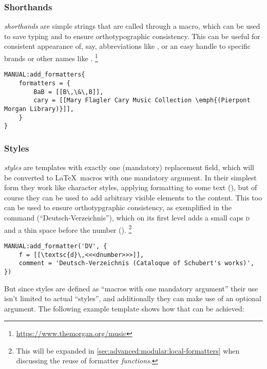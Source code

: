 \documentclass[12pt]{scrartcl}
\begin{document}
\subsubsection{Shorthands}
\label{sec:shorthands}

\emph{shorthands} are simple strings that are called through a macro, which can
be used to save typing and to ensure orthotypographic consistency.  This can be
useful for consistent appearance of, say, abbreviations like
, or an easy handle to specific brands or
other names like .%
\footnote{\url{https://www.themorgan.org/music}} %

\begin{verbatim}
MANUAL:add_formatters{
    formatters = {
        BaB = [[B\,\&\,B]],
        cary = [[Mary Flagler Cary Music Collection \emph{(Pierpont Morgan Library)}]],
    }
}
\end{verbatim}


\subsubsection{Styles}
\label{sec:defining:styles}

\emph{styles} are templates with exactly one (mandatory) replacement field,
which will be converted to \LaTeX\ macros with one mandatory argument.  In their
simplest form they work like character styles, applying formatting to some text
(), but of course they can be used
to add arbitrary visible elements to the content.  This too can be used to
ensure orthotypgraphic consistency, as exemplified in the command 
(“Deutsch-Verzeichnis”), which on its first level adds a small caps \textsc{d}
and a thin space before the number
().%
\footnote{This will be expanded in \vref{sec:advanced:modular:local-formatters}
when discussing the reuse of formatter \emph{functions}.}

\begin{verbatim}
MANUAL:add_formatter('DV', {
    f = [[\textsc{d}\,<<<dnumber>>>]],
    comment = 'Deutsch-Verzeichnis (Cataloque of Schubert's works)',
})
\end{verbatim}

\noindent But since styles are defined as “macros with one mandatory argument”
their use isn't limited to actual “styles”, and additionally they can make use
of an optional argument.  The following example template shows how that can be
achieved:
\end{document}
